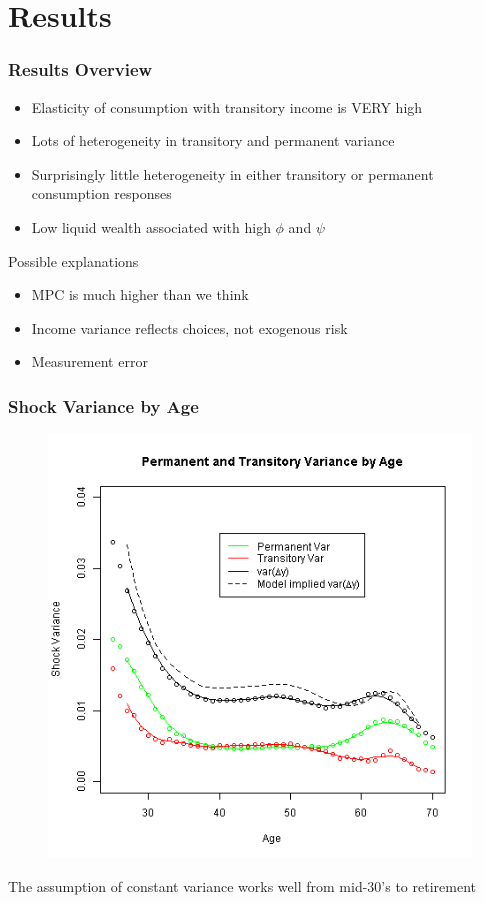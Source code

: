 \documentclass{beamer}
\begin{document}
\section{Results}
\frame
{
	\frametitle{Results Overview}
	\begin{itemize}
		\item Elasticity of consumption with transitory income is VERY high
		\item Lots of heterogeneity in transitory and permanent variance
		\item Surprisingly little heterogeneity in either transitory or permanent consumption responses
		\item Low liquid wealth associated with high $\phi$ and $\psi$
	\end{itemize}
	\pause
	Possible explanations
	\begin{itemize}
	\item MPC is much higher than we think
	\item Income variance reflects choices, not exogenous risk 
	\item Measurement error
	\end{itemize}
}
\frame
{
	\frametitle{Shock Variance by Age}
	\begin{figure}
		\includegraphics[scale=0.35]{../Figures/VarianceByAge.png}
	\end{figure}
	\vspace{-0.25in}
	The assumption of constant variance works well from mid-30's to retirement
}
\end{document}
